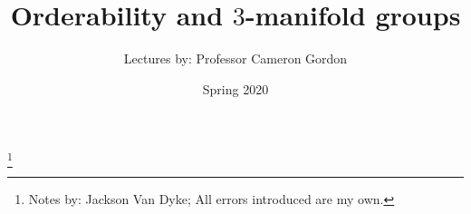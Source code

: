 \documentclass[12pt]{booc}
\begin{document}
\title{Orderability and \texorpdfstring{$3$}{three}-manifold groups}
\author{Lectures by: Professor Cameron Gordon}
\thanks{Notes by: Jackson Van Dyke; All errors introduced are my own.}
\date{Spring 2020}
\maketitle
\tableofcontents












\end{document}
